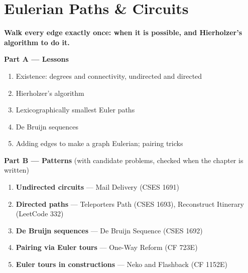 \chapter{Eulerian Paths \& Circuits}
\label{ch:euler}

\begin{tcolorbox}[enhanced, colback=white, colframe=secondaryblue, boxrule=1pt, arc=2mm]
\textbf{\large\textcolor{primaryblue}{Walk every edge exactly once: when it is possible, and Hierholzer's algorithm to do it.}}
\end{tcolorbox}


\begin{plannedbox}
\textbf{Part A --- Lessons}
\begin{enumerate}[leftmargin=*, label=\textbf{A\arabic*.}, itemsep=1pt]
    \item Existence: degrees and connectivity, undirected and directed
    \item Hierholzer's algorithm
    \item Lexicographically smallest Euler paths
    \item De Bruijn sequences
    \item Adding edges to make a graph Eulerian; pairing tricks
\end{enumerate}
\textbf{Part B --- Patterns} (with candidate problems, checked when the chapter is written)
\begin{enumerate}[leftmargin=*, label=\textbf{P\arabic*.}, itemsep=1pt]
    \item \textbf{Undirected circuits} --- Mail Delivery {\small\color{darkgray}(CSES 1691)}
    \item \textbf{Directed paths} --- Teleporters Path {\small\color{darkgray}(CSES 1693)}, Reconstruct Itinerary {\small\color{darkgray}(LeetCode 332)}
    \item \textbf{De Bruijn sequences} --- De Bruijn Sequence {\small\color{darkgray}(CSES 1692)}
    \item \textbf{Pairing via Euler tours} --- One-Way Reform {\small\color{darkgray}(CF 723E)}
    \item \textbf{Euler tours in constructions} --- Neko and Flashback {\small\color{darkgray}(CF 1152E)}
\end{enumerate}
\end{plannedbox}
